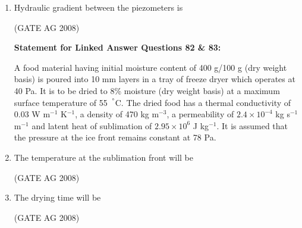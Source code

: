 \documentclass[journal]{IEEEtran}
\begin{document}
\begin{enumerate}
\medskip

\item 
 Hydraulic gradient between the piezometers is
\begin{enumerate}
\end{enumerate}
\hfill(GATE AG 2008)\\

\medskip

\textbf{Statement for Linked Answer Questions 82 \& 83:}

A food material having initial moisture content of 400 g/100 g (dry weight basis) is poured into 10 mm layers in a tray of freeze dryer which operates at 40 Pa. It is to be dried to 8\% moisture (dry weight basis) at a maximum surface temperature of 55~$^ \degree$C. The dried food has a thermal conductivity of 0.03 W m$^{-1}$ K$^{-1}$, a density of 470 kg m$^{-3}$, a permeability of $2.4\times 10^{-4}$ kg s$^{-1}$ m$^{-1}$ and latent heat of sublimation of $2.95 \times 10^6$ J kg$^{-1}$. It is assumed that the pressure at the ice front remains constant at 78 Pa.


\item 
 The temperature at the sublimation front will be
\begin{enumerate}
\end{enumerate}
\hfill(GATE AG 2008)\\

\medskip

\item 
 The drying time will be
\begin{enumerate}
\end{enumerate}
\hfill(GATE AG 2008)\\


\end{enumerate}
\end{document}
